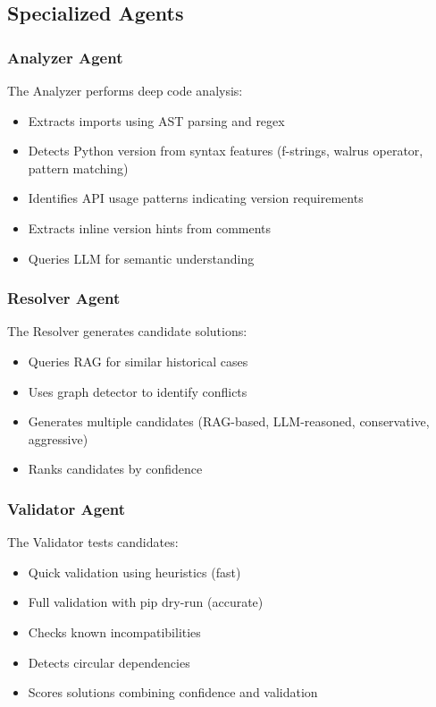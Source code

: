 \documentclass[sigconf]{acmart}
\begin{document}
\subsection{Specialized Agents}

\subsubsection{Analyzer Agent}

The Analyzer performs deep code analysis:
\begin{itemize}
\item Extracts imports using AST parsing and regex
\item Detects Python version from syntax features (f-strings, walrus operator, pattern matching)
\item Identifies API usage patterns indicating version requirements
\item Extracts inline version hints from comments
\item Queries LLM for semantic understanding
\end{itemize}

\subsubsection{Resolver Agent}

The Resolver generates candidate solutions:
\begin{itemize}
\item Queries RAG for similar historical cases
\item Uses graph detector to identify conflicts
\item Generates multiple candidates (RAG-based, LLM-reasoned, conservative, aggressive)
\item Ranks candidates by confidence
\end{itemize}

\subsubsection{Validator Agent}

The Validator tests candidates:
\begin{itemize}
\item Quick validation using heuristics (fast)
\item Full validation with pip dry-run (accurate)
\item Checks known incompatibilities
\item Detects circular dependencies
\item Scores solutions combining confidence and validation
\end{itemize}
\end{document}
